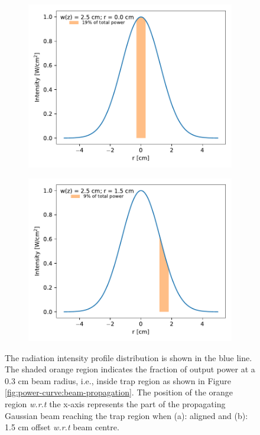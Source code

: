 \begin{figure}[!htb]
    \centering
    \begin{subfigure}{0.49\textwidth}
        \centering
        \includegraphics[width=1\textwidth]{figures/measurements/power-curve-453GHz/beam_propagation_power_curve_w0-2.50_offset-0.00_dia-0.60.pdf}
        \caption{}
        \label{fig:power-curve:beam-propagation-power:at0}
    \end{subfigure}
    \hfill
    \begin{subfigure}{0.49\textwidth}
        \centering
        \includegraphics[width=1\textwidth]{figures/measurements/power-curve-453GHz/beam_propagation_power_curve_w0-2.50_offset-1.50_dia-0.60.pdf}
        \caption{}
        \label{fig:power-curve:beam-propagation-power:offset}
    \end{subfigure}
    \caption{The radiation intensity profile distribution is shown in the blue line. The shaded orange region indicates the fraction of output power at a 0.3 cm beam radius, i.e., inside trap region as shown in Figure \ref{fig:power-curve:beam-propagation}. The position of the orange region \emph{w.r.t} the x-axis represents the part of the propagating Gaussian beam reaching the trap region when (a): aligned and (b): 1.5 cm offset \emph{w.r.t} beam centre.}
    \label{fig:power-curve:beam-propagation-power}
\end{figure}
